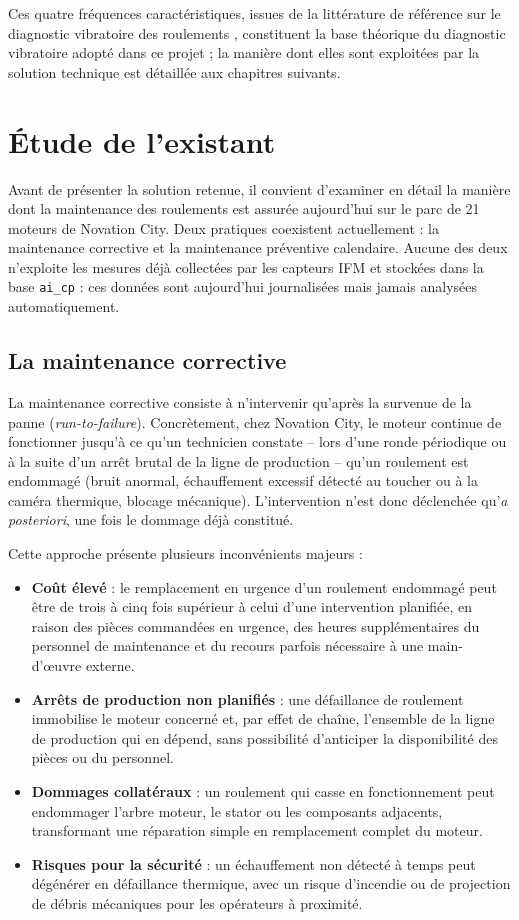 \documentclass[12pt,a4paper]{report}
\begin{document}
\noindent Ces quatre fréquences caractéristiques, issues de la littérature de référence sur
le diagnostic vibratoire des roulements \cite{randall2011}, constituent la base théorique
du diagnostic vibratoire adopté dans ce projet ; la manière dont elles sont exploitées par
la solution technique est détaillée aux chapitres suivants.

\section{Étude de l'existant}

Avant de présenter la solution retenue, il convient d'examiner en détail la manière dont la
maintenance des roulements est assurée aujourd'hui sur le parc de 21 moteurs de Novation City.
Deux pratiques coexistent actuellement : la maintenance corrective et la maintenance préventive
calendaire. Aucune des deux n'exploite les mesures déjà collectées par les capteurs IFM et
stockées dans la base \texttt{ai\_cp} : ces données sont aujourd'hui journalisées mais jamais
analysées automatiquement.

\subsection{La maintenance corrective}

La maintenance corrective consiste à n'intervenir qu'après la survenue de la panne
(\textit{run-to-failure}). Concrètement, chez Novation City, le moteur continue de fonctionner
jusqu'à ce qu'un technicien constate -- lors d'une ronde périodique ou à la suite d'un arrêt
brutal de la ligne de production -- qu'un roulement est endommagé (bruit anormal, échauffement
excessif détecté au toucher ou à la caméra thermique, blocage mécanique). L'intervention n'est
donc déclenchée qu'\textit{a posteriori}, une fois le dommage déjà constitué.

Cette approche présente plusieurs inconvénients majeurs :
\begin{itemize}
  \item \textbf{Coût élevé} : le remplacement en urgence d'un roulement endommagé peut être de
  trois à cinq fois supérieur à celui d'une intervention planifiée, en raison des pièces
  commandées en urgence, des heures supplémentaires du personnel de maintenance et du recours
  parfois nécessaire à une main-d'œuvre externe.
  \item \textbf{Arrêts de production non planifiés} : une défaillance de roulement immobilise le
  moteur concerné et, par effet de chaîne, l'ensemble de la ligne de production qui en dépend,
  sans possibilité d'anticiper la disponibilité des pièces ou du personnel.
  \item \textbf{Dommages collatéraux} : un roulement qui casse en fonctionnement peut endommager
  l'arbre moteur, le stator ou les composants adjacents, transformant une réparation simple en
  remplacement complet du moteur.
  \item \textbf{Risques pour la sécurité} : un échauffement non détecté à temps peut dégénérer en
  défaillance thermique, avec un risque d'incendie ou de projection de débris mécaniques pour les
  opérateurs à proximité.
\end{itemize}
\end{document}
